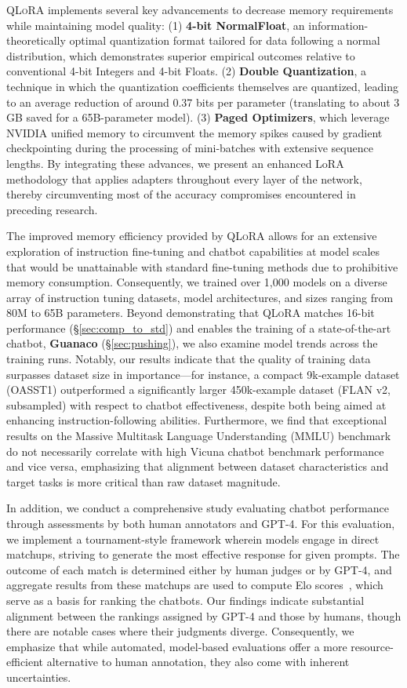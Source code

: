 \textsc{QLoRA} implements several key advancements to decrease memory requirements while maintaining model quality: (1) \textbf{4-bit NormalFloat}, an information-theoretically optimal quantization format tailored for data following a normal distribution, which demonstrates superior empirical outcomes relative to conventional 4-bit Integers and 4-bit Floats. (2) \textbf{Double Quantization}, a technique in which the quantization coefficients themselves are quantized, leading to an average reduction of around 0.37 bits per parameter (translating to about 3 GB saved for a 65B-parameter model). (3) \textbf{Paged Optimizers}, which leverage NVIDIA unified memory to circumvent the memory spikes caused by gradient checkpointing during the processing of mini-batches with extensive sequence lengths. By integrating these advances, we present an enhanced LoRA methodology that applies adapters throughout every layer of the network, thereby circumventing most of the accuracy compromises encountered in preceding research.

The improved memory efficiency provided by \textsc{QLoRA} allows for an extensive exploration of instruction fine-tuning and chatbot capabilities at model scales that would be unattainable with standard fine-tuning methods due to prohibitive memory consumption. Consequently, we trained over 1,000 models on a diverse array of instruction tuning datasets, model architectures, and sizes ranging from 80M to 65B parameters. Beyond demonstrating that \textsc{QLoRA} matches 16-bit performance (\S\ref{sec:comp_to_std}) and enables the training of a state-of-the-art chatbot, \textbf{Guanaco} (\S\ref{sec:pushing}), we also examine model trends across the training runs. Notably, our results indicate that the quality of training data surpasses dataset size in importance—for instance, a compact 9k-example dataset (OASST1) outperformed a significantly larger 450k-example dataset (FLAN v2, subsampled) with respect to chatbot effectiveness, despite both being aimed at enhancing instruction-following abilities. Furthermore, we find that exceptional results on the Massive Multitask Language Understanding (MMLU) benchmark do not necessarily correlate with high Vicuna chatbot benchmark performance and vice versa, emphasizing that alignment between dataset characteristics and target tasks is more critical than raw dataset magnitude.

In addition, we conduct a comprehensive study evaluating chatbot performance through assessments by both human annotators and GPT-4. For this evaluation, we implement a tournament-style framework wherein models engage in direct matchups, striving to generate the most effective response for given prompts. The outcome of each match is determined either by human judges or by GPT-4, and aggregate results from these matchups are used to compute Elo scores~\citep{elo1967proposed, elo1978rating}, which serve as a basis for ranking the chatbots. Our findings indicate substantial alignment between the rankings assigned by GPT-4 and those by humans, though there are notable cases where their judgments diverge. Consequently, we emphasize that while automated, model-based evaluations offer a more resource-efficient alternative to human annotation, they also come with inherent uncertainties.


